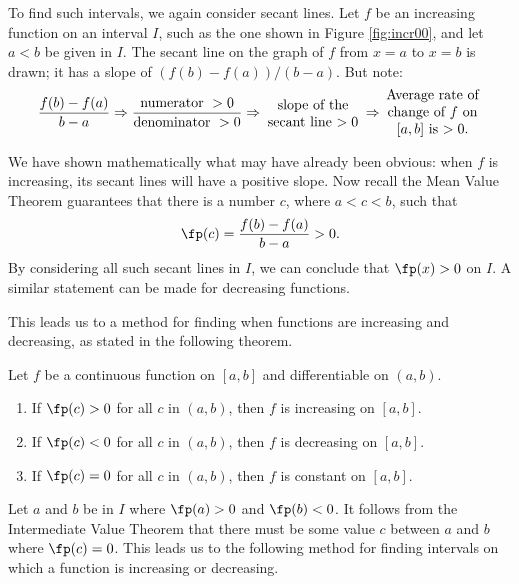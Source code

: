 To find such intervals, we again consider secant lines. Let $f$ be an increasing function on an interval $I$, such as the one shown in Figure \ref{fig:incr00}, and let $a<b$ be given in $I$. The secant line on the graph of $f$ from $x=a$ to $x=b$ is drawn; it has a slope of $(f(b)-f(a))/(b-a)$. But note:
$$\frac{f(b)-f(a)}{b-a} \Rightarrow \frac{\text{numerator }>0}{\text{denominator } >0} \Rightarrow \parbox{70pt}{\centering slope of the secant line $>0$} \Rightarrow \parbox{70pt}{\centering Average rate of change of $f$ on $[a,b]$ is $>0$.}$$


We have shown mathematically what may have already been obvious: when $f$ is increasing, its secant lines will have a positive slope. Now recall the Mean Value Theorem guarantees that there is a number $c$, where $a<c<b$, such that $$\fp(c) = \frac{f(b)-f(a)}{b-a}>0.$$ By considering all such secant lines in $I$, we can conclude that $\fp(x) > 0$ on $I$. A similar statement can be made for decreasing functions.

This leads us to a method for finding when functions are increasing and decreasing, as stated in the following theorem.

%
{Let $f$ be a continuous function on $[a,b]$ and differentiable on $(a,b)$.
\begin{enumerate}
\item		If $\fp(c) > 0$ for all $c$ in $(a,b)$, then $f$ is increasing on $[a,b]$.
\item		If $\fp(c) <0$ for all $c$ in $(a,b)$, then $f$ is decreasing on $[a,b]$.
\item		If $\fp(c) =0$ for all $c$ in $(a,b)$, then $f$ is constant on $[a,b]$.
\end{enumerate}
}


Let $a$ and $b$ be in $I$ where $\fp(a)>0$ and $\fp(b)<0$. It follows from the Intermediate Value Theorem that there must be some value $c$ between $a$ and $b$ where $\fp(c) = 0$. This leads us to the following method for finding intervals on which a function is increasing or decreasing.

